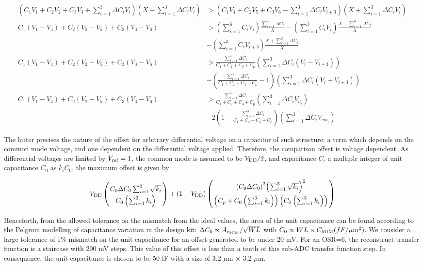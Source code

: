 \begin{align}
	\left(C_1V_1+C_2V_2+C_3V_3+\sum_{i=1}^{3}{\Delta C_i V_i}\right)\left(X-\sum_{i=1}^{3}{\Delta C_i V_i}\right) &> \left(C_1V_4+C_2V_5+C_3V_6-\sum_{i=1}^{3}{\Delta C_i V_{i+3}}\right)\left(X+\sum_{i=1}^{3}{\Delta C_i V_i}\right) \\
	C_1(V_1-V_4)+C_2(V_2-V_5)+C_3(V_3-V_6) &> \left(\sum_{i=1}^{6}{C_i V_i}\right)\frac{\sum_{i=1}^{3}{\Delta C_i}}{X} - \left(\sum_{i=1}^{3}{C_i V_i}\right)\frac{X-\sum_{i=1}^{3}{\Delta C_i}}{X} \\
	&- \left(\sum_{i=1}^{3}{C_i V_{i+3}}\right)\frac{X+\sum_{i=1}^{3}{\Delta C_i}}{X} \nonumber \\
	C_1(V_1-V_4)+C_2(V_2-V_5)+C_3(V_3-V_6) &> \frac{\sum_{i=1}^{3}{\Delta C_i}}{C_1+C_2+C_3+C_p}\left(\sum_{i=1}^{3}{\Delta C_i (V_i-V_{i+3})}\right) \\
	&- \left(\frac{\sum_{i=1}^{3}{\Delta C_i}}{C_1+C_2+C_3+C_p}-1\right)\left(\sum_{i=1}^{3}{\Delta C_i (V_i+V_{i+3})}\right) \nonumber \\
	C_1(V_1-V_4)+C_2(V_2-V_5)+C_3(V_3-V_6) &> \frac{\sum_{i=1}^{3}{\Delta C_i}}{C_1+C_2+C_3+C_p}\left(\sum_{i=1}^{3}{\Delta C_i V_{d_i}}\right) \\
	&- 2\left(1-\frac{\sum_{i=1}^{3}{\Delta C_i}}{C_1+C_2+C_3+C_p}\right)\left(\sum_{i=1}^{3}{\Delta C_i V_{cm_i}}\right) \nonumber
\end{align}

The latter precises the nature of the offset for arbitrary differential voltage on a capacitor of such structure: a term which depends on the common mode voltage, and one dependent on the differential voltage applied. Therefore, the comparison offset is voltage dependent. As differential voltages are limited by \(V_{\rm ref} = 1\), the common mode is assumed to be \(V_{\rm DD}/2\), and capacitance \(C_i\) a multiple integer of unit capacitance \(C_0\) as \(k_iC_0\), the maximum offset is given by

\begin{equation}
 V_{\rm DD}\left(\frac{C_0 \Delta C_0\sum_{i=1}^{3}{\sqrt{k_i}}}{C_0\left(\sum_{i=1}^{3}{k_i}\right)}\right)+(1-V_{\rm DD})\left(\frac{{\left(C_0 \Delta C_0\right)}^2{\left(\sum_{i=1}^{3}{\sqrt{k_i}}\right)}^2}{\left(C_p+C_0\left(\sum_{i=1}^{3}{k_i}\right)\right)\left(C_0\left(\sum_{i=1}^{3}{k_i}\right)\right)} \right)
\end{equation}

Henceforth, from the allowed tolerance on the mismatch from the ideal values, the area of the unit capacitance can be found according to the Pelgrom modelling of capacitance variation in the design kit: \(\Delta C_0 \propto A_{c_{\rm MIM}}/\sqrt{WL} \) with \(C_0 \propto WL\times C_{\rm MIM}(fF/\mu m^2)\). We consider a large tolerance of 1\% mismatch on the unit capacitance for an offset generated to be under 20 mV. For an OSR=6, the reconstruct transfer function is a staircase with 200 mV steps. This value of this offset is less than a tenth of this sub-ADC transfer function step. In consequence, the unit capacitance is chosen to be 50 fF with a size of 3.2 $\mu$m $\times$ 3.2 $\mu$m.

